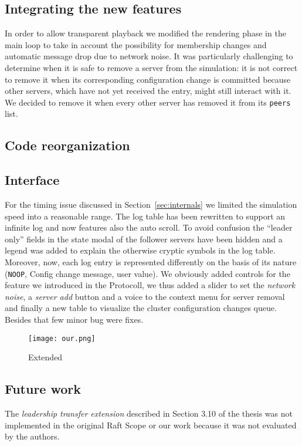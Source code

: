 \subsection{Integrating the new features}
In order to allow transparent playback we modified the rendering phase in the main loop to take in account the possibility for
membership changes and automatic message drop due to network noise.
It was particularly challenging to determine when it is safe to remove a server
from the simulation: it is not correct to remove it when its corresponding configuration change is committed because
other servers, which have not yet received the entry, might still interact with it.
We decided to remove it when every other server has removed it from its \texttt{peers} list.

\subsection{Code reorganization}

\subsection{Interface}
For the timing issue discussed in Section~\ref{sec:internals} we limited the
simulation speed into a reasonable range.
The log table has been rewritten to support an infinite log and
now features also the auto scroll.
To avoid confusion the ``leader only'' fields in the state modal of the
follower servers have been hidden and a legend was added to explain the
otherwise cryptic symbols in the log table. Moreover, now, each log entry
is represented differently on the basis of its nature (\texttt{NOOP}, Config
change message, user value).
We obviously added controls for the feature we introduced in the Protocoll,
we thus added a slider to set the \emph{network noise}, a \emph{server add}
button and a voice to the context menu for server removal and finally
a new table to visualize the cluster configuration changes queue.
Besides that few minor bug were fixes.

\begin{figure*}[h]
    \centering
    \texttt{[image: our.png]}
    \caption{Extended}\label{fig:final}
\end{figure*}

\subsection{Future work}
The \emph{leadership transfer extension} described in Section 3.10 of the thesis
was not implemented in the original Raft Scope or our work because it was not evaluated by the authors.